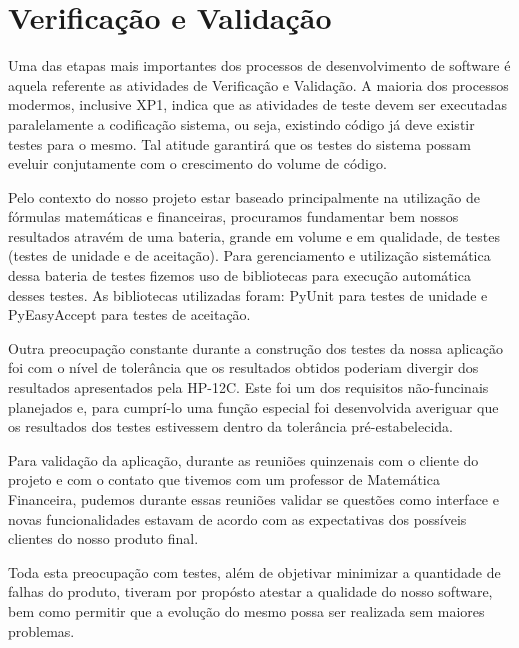 \chapter{Verificação e Validação}
Uma das etapas mais importantes dos processos de desenvolvimento de software é aquela referente as atividades de Verificação e Validação. A maioria dos processos  modermos, inclusive XP1, indica que as atividades de teste devem ser executadas paralelamente a codificação sistema, ou seja, existindo código já deve existir testes para o mesmo. Tal atitude garantirá que os testes do sistema possam eveluir conjutamente com o crescimento do volume de código.

Pelo contexto do nosso projeto estar baseado principalmente na utilização de fórmulas matemáticas e financeiras, procuramos fundamentar bem nossos resultados atravém de uma bateria, grande em volume e em qualidade, de testes (testes de unidade e de aceitação). Para gerenciamento e utilização sistemática dessa bateria de testes fizemos uso de bibliotecas para execução automática desses testes. As bibliotecas utilizadas foram: PyUnit para testes de unidade e PyEasyAccept para testes de aceitação.

Outra preocupação constante durante a construção dos testes da nossa aplicação foi com o nível de tolerância que os resultados obtidos poderiam divergir dos resultados apresentados pela HP-12C. Este foi um dos requisitos não-funcinais planejados e, para cumprí-lo uma função especial foi desenvolvida averiguar que os resultados dos testes estivessem dentro da tolerância pré-estabelecida.

Para validação da aplicação, durante as reuniões quinzenais com o cliente do projeto e com o contato que tivemos com um professor de Matemática Financeira, pudemos durante essas reuniões validar se questões como interface e novas funcionalidades estavam de acordo com as expectativas dos possíveis clientes do nosso produto final.

Toda esta preocupação com testes, além de objetivar minimizar a quantidade de falhas do produto, tiveram por propósto atestar a qualidade do nosso software, bem como permitir que a evolução do mesmo possa ser realizada sem maiores problemas.